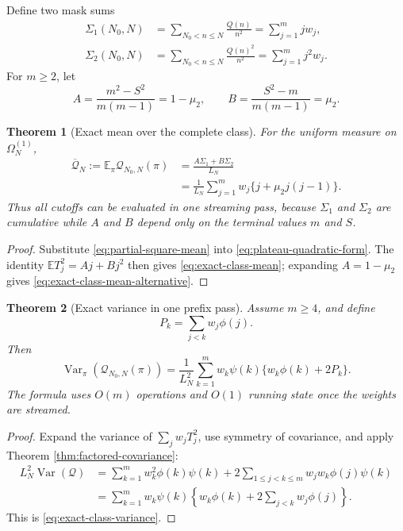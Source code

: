 \documentclass[11pt,reqno]{amsart}
\numberwithin{equation}{section}
\theoremstyle{plain}
\newtheorem{theorem}{Theorem}[section]
\theoremstyle{definition}
\theoremstyle{remark}
\newcommand{\E}{\mathbb E}
\newcommand{\Var}{\operatorname{Var}}
\newcommand{\Om}{\Omega}
\newcommand{\QF}{\mathcal Q}
\begin{document}
Define two mask sums
\begin{align}
\Sigma_1(N_0,N)
&=\sum_{N_0<n\leq N}\frac{Q(n)}{n^2}
=\sum_{j=1}^m j w_j,
\label{eq:sigma-one}\\
\Sigma_2(N_0,N)
&=\sum_{N_0<n\leq N}\frac{Q(n)^2}{n^2}
=\sum_{j=1}^m j^2w_j.
\label{eq:sigma-two}
\end{align}
For \(m\geq2\), let
\begin{equation}
A=\frac{m^2-S^2}{m(m-1)}=1-\mu_2,\qquad
B=\frac{S^2-m}{m(m-1)}=\mu_2.
\label{eq:quadratic-reduction-coefficients}
\end{equation}

\begin{theorem}[Exact mean over the complete class]
\label{thm:exact-class-mean}
For the uniform measure on \(\Om_N^{(1)}\),
\begin{align}
\overline{\QF}_N
:=\E_{\pi}\QF_{N_0,N}(\pi)
&=\frac{A\Sigma_1+B\Sigma_2}{L_N}
\label{eq:exact-class-mean}\\
&=\frac{1}{L_N}\sum_{j=1}^m
w_j\{j+\mu_2j(j-1)\}.
\label{eq:exact-class-mean-alternative}
\end{align}
Thus all cutoffs can be evaluated in one streaming pass, because
\(\Sigma_1\) and \(\Sigma_2\) are cumulative while \(A\) and \(B\) depend
only on the terminal values \(m\) and \(S\).
\end{theorem}

\begin{proof}
Substitute \eqref{eq:partial-square-mean} into
\eqref{eq:plateau-quadratic-form}.  The identity
\(\E T_j^2=Aj+Bj^2\) then gives \eqref{eq:exact-class-mean}; expanding
\(A=1-\mu_2\) gives \eqref{eq:exact-class-mean-alternative}.
\end{proof}

\begin{theorem}[Exact variance in one prefix pass]
\label{thm:exact-class-variance}
Assume \(m\geq4\), and define
\begin{equation}
P_k=\sum_{j<k}w_j\phi(j).
\label{eq:variance-prefix}
\end{equation}
Then
\begin{equation}
\Var_{\pi}\!\left(\QF_{N_0,N}(\pi)\right)
=\frac{1}{L_N^2}\sum_{k=1}^{m}
w_k\psi(k)\{w_k\phi(k)+2P_k\}.
\label{eq:exact-class-variance}
\end{equation}
The formula uses \(O(m)\) operations and \(O(1)\) running state once the
weights are streamed.
\end{theorem}

\begin{proof}
Expand the variance of \(\sum_jw_jT_j^2\), use symmetry of covariance, and
apply Theorem \ref{thm:factored-covariance}:
\begin{align}
L_N^2\Var(\QF)
&=\sum_{k=1}^m w_k^2\phi(k)\psi(k)
+2\sum_{1\leq j<k\leq m}w_jw_k\phi(j)\psi(k)
\label{eq:variance-triangular-sum}\\
&=\sum_{k=1}^{m}w_k\psi(k)
\left\{w_k\phi(k)+2\sum_{j<k}w_j\phi(j)\right\}.
\label{eq:variance-prefix-collapse}
\end{align}
This is \eqref{eq:exact-class-variance}.
\end{proof}
\end{document}
